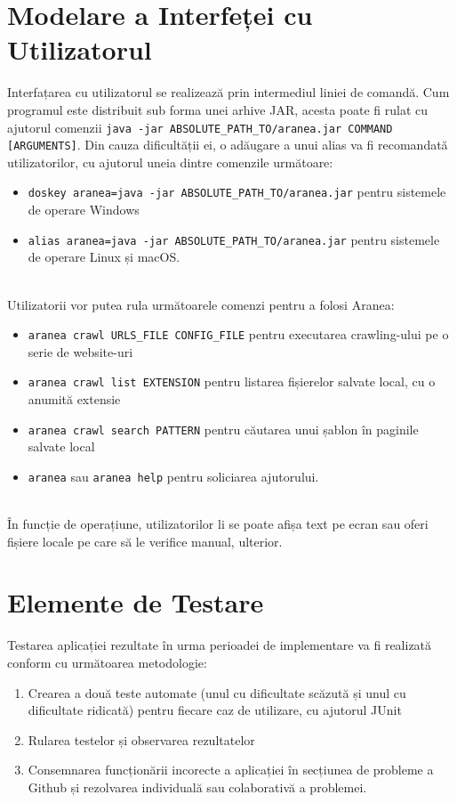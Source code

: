 \documentclass[12pt]{article}
\begin{document}
\newpage

\section{Modelare a Interfeței cu Utilizatorul}

Interfațarea cu utilizatorul se realizează prin intermediul liniei de comandă. Cum programul este distribuit sub forma unei arhive JAR, acesta poate fi rulat cu ajutorul comenzii \texttt{java -jar ABSOLUTE_PATH_TO/aranea.jar COMMAND [ARGUMENTS]}. Din cauza dificultății ei, o adăugare a unui alias va fi recomandată utilizatorilor, cu ajutorul uneia dintre comenzile următoare:
\begin{itemize}
    \item \texttt{doskey aranea=java -jar ABSOLUTE_PATH_TO/aranea.jar} pentru sistemele de operare Windows
    \item \texttt{alias aranea=java -jar ABSOLUTE_PATH_TO/aranea.jar} pentru sistemele de operare Linux și macOS.
\end{itemize} \\
Utilizatorii vor putea rula următoarele comenzi pentru a folosi Aranea:
\begin{itemize}
    \item \texttt{aranea crawl URLS_FILE CONFIG_FILE} pentru executarea crawling-ului pe o serie de website-uri
    \item \texttt{aranea crawl list EXTENSION} pentru listarea fișierelor salvate local, cu o anumită extensie
    \item \texttt{aranea crawl search PATTERN} pentru căutarea unui șablon în paginile salvate local
    \item \texttt{aranea} sau \texttt{aranea help} pentru soliciarea ajutorului.
\end{itemize} \\
În funcție de operațiune, utilizatorilor li se poate afișa text pe ecran sau oferi fișiere locale pe care să le verifice manual, ulterior.

\newpage

\section{Elemente de Testare}

Testarea aplicației rezultate în urma perioadei de implementare va fi realizată conform cu următoarea metodologie:
\begin{enumerate}
    \item Crearea a două teste automate (unul cu dificultate scăzută și unul cu dificultate ridicată) pentru fiecare caz de utilizare, cu ajutorul JUnit
    \item Rularea testelor și observarea rezultatelor
    \item Consemnarea funcționării incorecte a aplicației în secțiunea de probleme a Github și rezolvarea individuală sau colaborativă a problemei.
\end{enumerate}
\end{document}
